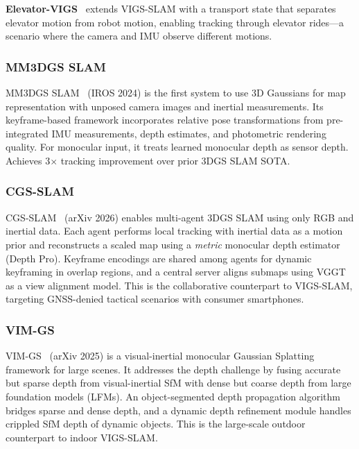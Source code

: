 \textbf{Elevator-VIGS}~\cite{zhou2026_elevatorvigs} extends VIGS-SLAM with
a transport state that separates elevator motion from robot motion,
enabling tracking through elevator rides---a scenario where the camera and
IMU observe different motions.

\subsubsection{MM3DGS SLAM}

MM3DGS SLAM~\cite{sun2024_mm3dgs} (IROS 2024) is the first system to use
3D Gaussians for map representation with unposed camera images and inertial
measurements.  Its keyframe-based framework incorporates relative pose
transformations from pre-integrated IMU measurements, depth estimates, and
photometric rendering quality.  For monocular input, it treats learned
monocular depth as sensor depth.  Achieves 3$\times$ tracking improvement
over prior 3DGS SLAM SOTA.

\subsubsection{CGS-SLAM}

CGS-SLAM~\cite{deambrogi2026_cgssslam} (arXiv 2026) enables multi-agent
3DGS SLAM using only RGB and inertial data.  Each agent performs local
tracking with inertial data as a motion prior and reconstructs a scaled map
using a \emph{metric} monocular depth estimator (Depth Pro).  Keyframe
encodings are shared among agents for dynamic keyframing in overlap
regions, and a central server aligns submaps using VGGT~\cite{wang2025_vggt}
as a view alignment model.  This is the collaborative counterpart to
VIGS-SLAM, targeting GNSS-denied tactical scenarios with consumer
smartphones.

\subsubsection{VIM-GS}

VIM-GS~\cite{zhang2026_vimgs} (arXiv 2025) is a visual-inertial monocular
Gaussian Splatting framework for large scenes.  It addresses the depth
challenge by fusing accurate but sparse depth from visual-inertial SfM with
dense but coarse depth from large foundation models (LFMs).  An
object-segmented depth propagation algorithm bridges sparse and dense
depth, and a dynamic depth refinement module handles crippled SfM depth of
dynamic objects.  This is the large-scale outdoor counterpart to indoor
VIGS-SLAM.

